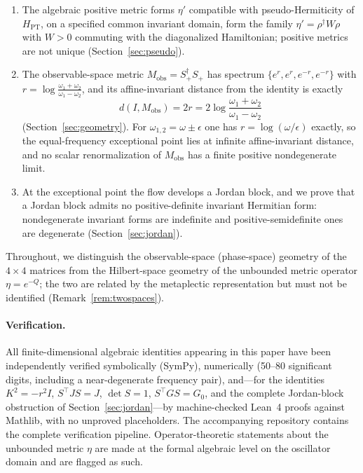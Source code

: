 \documentclass[11pt]{article}
\theoremstyle{definition}
\theoremstyle{remark}
\newcommand{\w}{\omega}
\newcommand{\Mobs}{M_{\mathrm{obs}}}
\newcommand{\dg}{\dagger}
\begin{document}
\begin{enumerate}
\item The algebraic positive metric forms $\eta'$ compatible with
pseudo-Hermiticity of $H_{\mathrm{PT}}$, on a specified common invariant
domain, form the family
$\eta'=\rho^{\dg}W\rho$ with $W>0$ commuting with the diagonalized
Hamiltonian; positive metrics are not unique
(Section~\ref{sec:pseudo}).

\item The observable-space metric $\Mobs=S_+^{\dg}S_+$ has spectrum
$\{e^{r},e^{r},e^{-r},e^{-r}\}$ with
$r=\log\frac{\w_1+\w_2}{\w_1-\w_2}$, and its affine-invariant distance from
the identity is exactly
\begin{equation}
d(I,\Mobs)=2r=2\log\frac{\w_1+\w_2}{\w_1-\w_2}
\end{equation}
(Section~\ref{sec:geometry}).  For $\w_{1,2}=\w\pm\epsilon$ one has
$r=\log(\w/\epsilon)$ exactly, so the equal-frequency exceptional point lies
at infinite affine-invariant distance, and no scalar renormalization of
$\Mobs$ has a finite positive nondegenerate limit.

\item At the exceptional point the flow develops a Jordan block, and we prove
that a Jordan block admits no positive-definite invariant Hermitian form:
nondegenerate invariant forms are indefinite and positive-semidefinite ones
are degenerate (Section~\ref{sec:jordan}).
\end{enumerate}

Throughout, we distinguish the observable-space (phase-space) geometry of the
$4\times4$ matrices from the Hilbert-space geometry of the unbounded metric
operator $\eta=e^{-Q}$; the two are related by the metaplectic representation
but must not be identified (Remark~\ref{rem:twospaces}).

\paragraph{Verification.}
All finite-dimensional algebraic identities appearing in this paper have been
independently verified symbolically (SymPy), numerically (50--80 significant
digits, including a near-degenerate frequency pair), and---for the identities
$K^2=-r^2I$, $S^{\top}JS=J$, $\det S=1$, $S^{\top}GS=G_0$, and the complete
Jordan-block obstruction of Section~\ref{sec:jordan}---by machine-checked
Lean~4 proofs against Mathlib, with no unproved placeholders.  The
accompanying repository contains the complete verification pipeline.
Operator-theoretic statements about the unbounded metric $\eta$ are made at
the formal algebraic level on the oscillator domain and are flagged as such.
\end{document}
